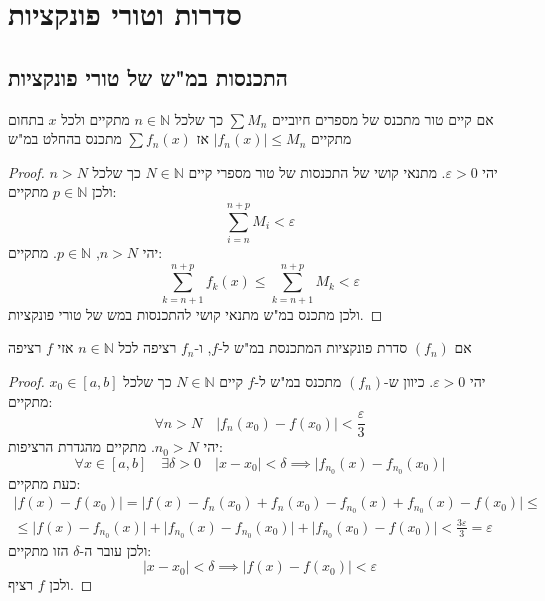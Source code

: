 \documentclass{tstextbook}
\begin{document}
\chapter{סדרות וטורי פונקציות}

\section{התכנסות במ"ש של טורי פונקציות}

\begin{proposition}
אם קיים טור מתכנס של מספרים חיוביים \(\sum M_n\) כך שלכל \(n\in \mathbb N\) מתקיים ולכל \(x\) בתחום מתקיים \(|f_n(x)|\leq M_n\) אז \(\sum f_n(x)\) מתכנס בהחלט במ"ש

\end{proposition}
\begin{proof}
יהי \(\varepsilon>0\). מתנאי קושי של התכנסות של טור מספרי קיים \(N \in \mathbb{N}\) כך שלכל \(n > N\) ולכן \(p \in \mathbb{N}\) מתקיים:
$$\sum_{i=n}^{n+p} M_{i}<\varepsilon$$
יהי \(n>N\), \(p \in \mathbb{N}\). מתקיים:
$$\sum_{k=n+1}^{n+p}f_{k}(x)\leq \sum_{k=n+1}^{n+p} M_{k}<\varepsilon$$
ולכן מתכנס במ"ש מתנאי קושי להתכנסות במש של טורי פונקציות.

\end{proof}
\begin{proposition}
אם \((f_{n})\) סדרת פונקציות המתכנסת במ"ש ל-\(f\), ו-\(f_{n}\) רציפה לכל \(n\in \mathbb{N}\) אזי \(f\) רציפה

\end{proposition}
\begin{proof}
יהי \(\varepsilon>0\). כיוון ש-\((f_{n})\) מתכנס במ"ש ל-\(f\) קיים \(N \in \mathbb{N}\) כך שלכל \(x_{0} \in [a,b]\) מתקיים:
$$\forall n > N\quad \lvert f_{n}(x_{0})-f(x_{0}) \rvert <\frac{\varepsilon}{3}$$
יהי \(n_{0}>N\). מתקיים מהגדרת הרציפות:
$$\forall x \in [a,b]\quad \exists \delta> 0\quad \lvert x-x_{0} \rvert <\delta\implies \lvert f_{n_{0}}(x)-f_{n_{0}}(x_{0}) \rvert $$
כעת מתקיים:
\begin{gather*}\lvert f(x)-f(x_{0}) \rvert =\lvert f(x)-f_{n}(x_{0})+f_{n}(x_{0})-f_{n_{0}}(x)+f_{n_{0}}(x)-f(x_{0}) \rvert \leq \\\leq \lvert f(x)-f_{n_{0}}(x) \rvert +\lvert f_{n_{0}}(x)-f_{n_{0}}(x_{0}) \rvert +\lvert f_{n_{0}}(x_{0})-f(x_{0}) \rvert <\frac{3\varepsilon}{3}=\varepsilon 
\end{gather*}
ולכן עובר ה-\(\delta\) הזו מתקיים:
$$\lvert x-x_{0} \rvert <\delta\implies \lvert f(x)-f(x_{0}) \rvert <\varepsilon$$
ולכן \(f\) רציף.

\end{proof}
\end{document}
